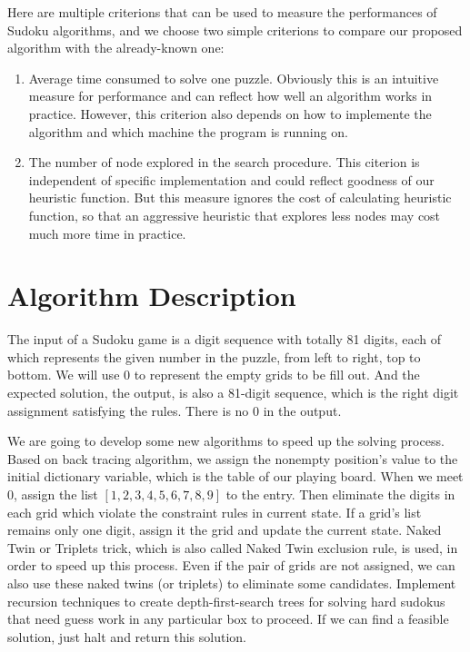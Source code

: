 \documentclass[12pt]{article}
\begin{document}
\begin{spacing}{1.1}
Here are multiple criterions that can be used to measure the performances of Sudoku algorithms, and we choose two simple criterions to compare our proposed algorithm with the already-known one:
\begin{enumerate}
	\item Average time consumed to solve one puzzle. Obviously this is an intuitive measure for performance and can reflect how well an algorithm works in practice. However, this criterion also depends on how to implemente the algorithm and which machine the program is running on.
	\item The number of node explored in the search procedure. This citerion is independent of specific implementation and could reflect goodness of our heuristic function. But this measure ignores the cost of calculating heuristic function, so that an aggressive heuristic that explores less nodes may cost much more time in practice.
\end{enumerate}


\section{Algorithm Description}

The input of a Sudoku game is a digit sequence with totally 81 digits, each of which represents the given number in the puzzle, from left to right, top to bottom. We will use $ 0 $ to represent the empty grids to be fill out. And the expected solution, the output, is also a 81-digit sequence, which is the right digit assignment satisfying the rules. There is no $ 0 $ in the output.

We are going to develop some new algorithms to speed up the solving process. Based on back tracing algorithm, we assign the nonempty position's value to the initial dictionary variable, which is the table of our playing board. When we meet $ 0 $, assign the list $ [1,2,3,4,5,6,7,8,9] $ to the entry. Then eliminate the digits in each grid which violate the constraint rules in current state. If a grid's list remains only one digit, assign it the grid and update the current state. Naked Twin or Triplets trick, which is also called Naked Twin exclusion rule, is used,  in order to speed up this process. Even if the pair of grids are not assigned, we can also use these naked twins (or triplets) to eliminate some candidates. Implement recursion techniques to create depth-first-search trees for solving hard sudokus that need guess work in any particular box to proceed. If we can find a feasible solution, just halt and return this solution.



\end{spacing}
\end{document}
